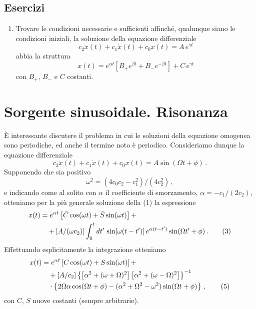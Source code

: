 \documentclass[11pt, a4paper]{book}
\numberwithin{equation}{section}
\newenvironment{esercizi}{\subsection*{Esercizi}\begin{enumerate}}{\end{enumerate}}
\begin{document}
\begin{esercizi}
    con $c_0 \neq 0$, è
    \begin{align*}
        x(t) &= e^{\alpha t} \left[ B_+ e^{\beta t} + B_- e^{-\beta t} \right] + \\
        &\quad + (a_N/c_0) \, t^N + \left[ (a_{N-1}/c_0) - (c_1 N a_N / c_0^2) \right] t^{N-1} + \\
        &\quad + P_{N-2}(t) \,,
    \end{align*}
    con $\alpha$ e $\beta$ dati dalle eq.~(3) e (6), $B_+$ e $B_-$ costanti arbitrarie,
    e $P_{N-2}(t)$ polinomio di grado $N-2$.
    \item Trovare le condizioni necessarie e sufficienti affinché, qualunque
    siano le condizioni iniziali, la soluzione della equazione differenziale
    \[
        c_2 \ddot{x}(t) + c_1 \dot{x}(t) + c_0 x(t) = A \, e^{\gamma t}
    \]
    abbia la struttura
    \[
        x(t) = e^{\alpha t} \left[ B_+ e^{\beta t} + B_- e^{-\beta t} \right] + C \, e^{\gamma t}
    \]
    con $B_+$, $B_-$ e $C$ costanti.
\end{esercizi}

\section{Sorgente sinusoidale. Risonanza}

È interessante discutere il problema in cui le soluzioni della equazione
omogenea sono periodiche, ed anche il termine noto è periodico. Consideriamo
dunque la equazione differenziale
\begin{equation}
    c_2 \ddot{x}(t) + c_1 \dot{x}(t) + c_0 x(t) = A \sin(\Omega t + \phi) \,.
\end{equation}
Supponendo che sia positivo
\begin{equation}
    \omega^2 = (4 c_0 c_2 - c_1^2) / (4 c_2^2) \,,
\end{equation}
e indicando come al solito con $\alpha$ il coefficiente di smorzamento,
$\alpha = -c_1/(2c_2)$, otteniamo per la più generale soluzione della (1) la
espressione
\begin{align}
    x(t) &= e^{\alpha t} \left[ \bar{C} \cos(\omega t) + \bar{S} \sin(\omega t) \right] + \notag \\
    &\quad + \left[ A/(\omega c_2) \right] \int_0^t dt' \, \sin[\omega(t-t')] \, e^{\alpha(t-t')} \sin(\Omega t' + \phi) \,. \tag{3}
\end{align}
Effettuando esplicitamente la integrazione otteniamo
\begin{align}
    x(t) &= e^{\alpha t} \left[ C \cos(\omega t) + S \sin(\omega t) \right] + \notag \\
    &\quad + \left[ A / c_2 \right] \left\{ \left[ \alpha^2 + (\omega+\Omega)^2 \right] \left[ \alpha^2 + (\omega-\Omega)^2 \right] \right\}^{-1} \notag \\
    &\quad \cdot \left\{ 2\Omega\alpha \cos(\Omega t+\phi) - (\alpha^2 + \Omega^2 - \omega^2) \sin(\Omega t + \phi) \right\} \,, \tag{5}
\end{align}
con $C$, $S$ nuove costanti (sempre arbitrarie).
\end{document}

